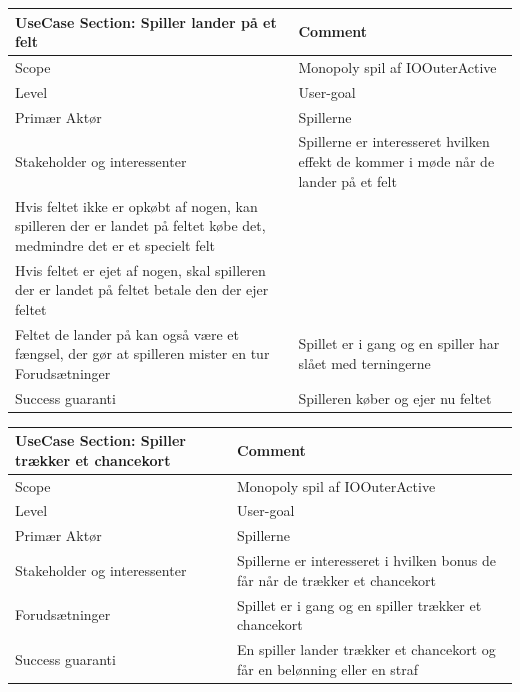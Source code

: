 \begin{center}
\begin{tabular}{ | m{10em} | m{10cm}| }
        \hline
            UseCase Section: Spiller lander på et felt & Comment\\
        \hline
            Scope & Monopoly spil af IOOuterActive\\
        \hline
            Level & User-goal\\
        \hline
            Primær Aktør & Spillerne\\
        \hline
            Stakeholder og interessenter & Spillerne er interesseret hvilken effekt de kommer i møde når de lander på et felt\\
            Hvis feltet ikke er opkøbt af nogen, kan spilleren der er landet på feltet købe det, medmindre det er et specielt felt\\
            Hvis feltet er ejet af nogen, skal spilleren der er landet på feltet betale den der ejer feltet\\
            Feltet de lander på kan også være et fængsel, der gør at spilleren mister en tur 
        \hline
            Forudsætninger & Spillet er i gang og en spiller har slået med terningerne\\
        \hline
            Success guaranti & Spilleren køber og ejer nu feltet\\
        \hline
    \end{tabular}
\end{center}

\begin{center}
\begin{tabular}{ | m{10em} | m{10cm}| }
        \hline
            UseCase Section: Spiller trækker et chancekort & Comment\\
        \hline
            Scope & Monopoly spil af IOOuterActive\\
        \hline
            Level & User-goal\\
        \hline
            Primær Aktør & Spillerne\\
        \hline
            Stakeholder og interessenter & Spillerne er interesseret i hvilken bonus de får når de trækker et chancekort\\
        \hline
            Forudsætninger & Spillet er i gang og en spiller trækker et chancekort\\
        \hline
            Success guaranti & En spiller lander trækker et chancekort og får en belønning eller en straf\\
        \hline
    \end{tabular}
\end{center}


